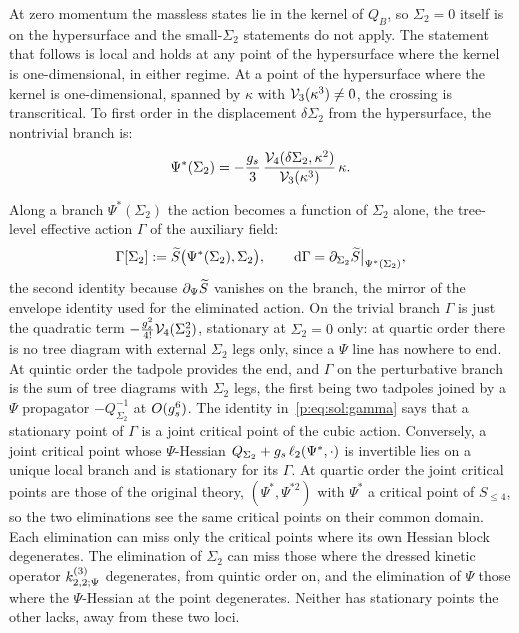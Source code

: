 At zero momentum the massless states lie in the kernel of $Q_B$, so $\Sigma_2 = 0$ itself is on the hypersurface and the small-$\Sigma_2$ statements do not apply.
The statement that follows is local and holds at any point of the hypersurface where the kernel is one-dimensional, in either regime.
At a point of the hypersurface where the kernel is one-dimensional, spanned by $\kappa$ with $\mathcal{V}_{3}(\kappa^3) \neq 0$, the crossing is transcritical.
To first order in the displacement $\delta \Sigma_2$ from the hypersurface, the nontrivial branch is:
\begin{equation}
  \label{p:eq:sol:transcritical}
  \Psi^*(\Sigma_2)
    = - \frac{g_s}{3} \, \frac{\mathcal{V}_{4}(\delta \Sigma_2, \kappa^2)}{\mathcal{V}_{3}(\kappa^3)} \, \kappa.
\end{equation}

Along a branch $\Psi^*(\Sigma_2)$ the action becomes a function of $\Sigma_2$ alone, the tree-level effective action $\Gamma$ of the auxiliary field:
\begin{equation}
  \label{p:eq:sol:gamma}
  \Gamma[\Sigma_2]
    := \widetilde{S}_{} \big( \Psi^*(\Sigma_2), \Sigma_2 \big),
  \qquad
  \mathrm{d} \Gamma
    = \partial_{\Sigma_2} \widetilde{S}_{} \big|_{\Psi^*(\Sigma_2)},
\end{equation}
the second identity because $\partial_\Psi \widetilde{S}_{}$ vanishes on the branch, the mirror of the envelope identity used for the eliminated action.
On the trivial branch $\Gamma$ is just the quadratic term $- \tfrac{g_s^2}{4!} \mathcal{V}_{4}(\Sigma_2^2)$, stationary at $\Sigma_2 = 0$ only: at quartic order there is no tree diagram with external $\Sigma_2$ legs only, since a $\Psi$ line has nowhere to end.
At quintic order the tadpole provides the end, and $\Gamma$ on the perturbative branch is the sum of tree diagrams with $\Sigma_2$ legs, the first being two tadpoles joined by a $\Psi$ propagator $- Q_{\Sigma_2}^{-1}$ at $O(g_s^6)$.
The identity in~\eqref{p:eq:sol:gamma} says that a stationary point of $\Gamma$ is a joint critical point of the cubic action.
Conversely, a joint critical point whose $\Psi$-Hessian $Q_{\Sigma_2} + g_s \, \ell_2(\Psi^*, \cdot)$ is invertible lies on a unique local branch and is stationary for its $\Gamma$.
At quartic order the joint critical points are those of the original theory, $(\Psi^*, \Psi^{* 2})$ with $\Psi^*$ a critical point of $S_{\le 4}$, so the two eliminations see the same critical points on their common domain.
Each elimination can miss only the critical points where its own Hessian block degenerates.
The elimination of $\Sigma_2$ can miss those where the dressed kinetic operator $\kin{2}{\Psi}{3}$ degenerates, from quintic order on, and the elimination of $\Psi$ those where the $\Psi$-Hessian at the point degenerates.
Neither has stationary points the other lacks, away from these two loci.

